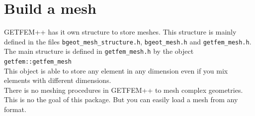\documentclass[11pt,a4paper]{article}
\begin{document}
\newpage
\tableofcontents
\newpage

\section{Build a mesh}
GETFEM++ has it own structure to store meshes. This structure is mainly defined in the files {\tt bgeot\_mesh\_structure.h}, {\tt bgeot\_mesh.h} and {\tt getfem\_mesh.h}. The main structure is defined in {\tt getfem\_mesh.h} by the object\\[0.5cm]
{\tt getfem::getfem\_mesh }\\[0.5cm]
This object is able to store any element in any dimension even if you mix elements with different dimensions.\\[0.5cm]

There is no meshing procedures in GETFEM++ to mesh complex geometries. This is no the goal of this package. But you can easily load a mesh from any format.
\end{document}
